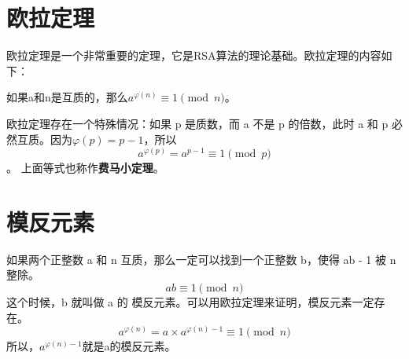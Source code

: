 \section{欧拉定理}

欧拉定理是一个非常重要的定理，它是RSA算法的理论基础。欧拉定理的内容如下：

如果a和n是互质的，那么$a^{\varphi(n)} \equiv 1 \pmod{n}$。

欧拉定理存在一个特殊情况：如果 p 是质数，而 a 不是 p 的倍数，此时 a 和 p 必然互质。因为$ \varphi(p) = p-1 $，所以
$$ a^{\varphi(p)} = a^{p-1} \equiv 1 \pmod{p}$$。
上面等式也称作\textbf{费马小定理}。

\section{模反元素}

如果两个正整数 a 和 n 互质，那么一定可以找到一个正整数 b，使得 ab - 1 被 n 整除。
$$ab \equiv 1 \pmod{n}$$
这个时候，b 就叫做 a 的 模反元素。可以用欧拉定理来证明，模反元素一定存在。
$$a^{\varphi(n)}= a\times a^{\varphi(n)-1} \equiv 1 \pmod{n}$$
所以，$a^{\varphi(n)-1}$就是a的模反元素。